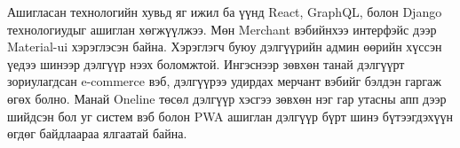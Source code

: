 Ашигласан технологийн хувьд яг ижил ба үүнд React, GraphQL, болон Django технологиудыг ашиглан хөгжүүлжээ. Мөн Merchant вэбийнхээ интерфэйс дээр Material-ui хэрэглэсэн байна.
Хэрэглэгч буюу дэлгүүрийн админ өөрийн хүссэн үедээ шинээр дэлгүүр нээх боломжтой. Ингэснээр зөвхөн танай дэлгүүрт зориулагдсан e-commerce вэб, дэлгүүрээ удирдах мерчант вэбийг бэлдэн гаргаж өгөх болно. Манай Oneline төсөл дэлгүүр хэсгээ зөвхөн нэг гар утасны апп дээр шийдсэн бол уг систем вэб болон PWA ашиглан дэлгүүр бүрт шинэ бүтээгдэхүүн өгдөг байдлаараа ялгаатай байна.